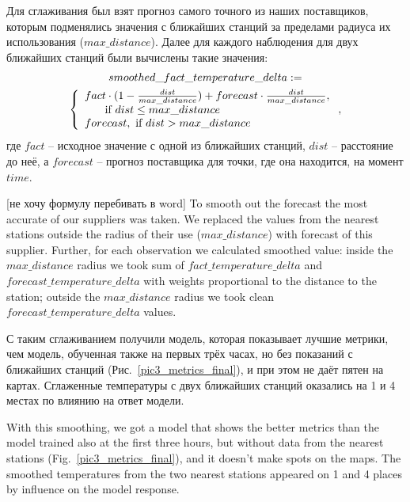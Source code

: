 \documentclass[14pt]{matmex-diploma}
\begin{document}
Для сглаживания был взят прогноз самого точного из наших поставщиков, которым подменялись значения с ближайших станций за пределами радиуса их использования ($max\_distance$). Далее для каждого наблюдения для двух ближайших станций были вычислены такие значения: 
\begingroup
\setlength\abovedisplayskip{0pt}
\begin{multline*}
smoothed\_fact\_temperature\_delta := \\\left\{
                \begin{array}{ll}
                  fact \cdot (1 - \frac{dist}{max\_distance}) + forecast \cdot \frac{dist}{max\_distance},\\\indent \text{     if }dist \le max\_distance  \\
                  forecast, \text{ if } dist > max\_distance
                \end{array}
              \right.,
\end{multline*}
\endgroup
\indent где $fact$ -- исходное значение с одной из ближайших станций, $dist$ -- расстояние до неё, а $forecast$ -- прогноз поставщика для точки, где она находится, на момент $time$.

[не хочу формулу перебивать в word] To smooth out the forecast the most accurate of our suppliers was taken. We replaced the values from the nearest stations outside the radius of their use ($max\_distance$) with forecast of this supplier. Further, for each observation we calculated smoothed value: inside the $max\_distance$ radius we took sum of $fact\_temperature\_delta$ and $forecast\_temperature\_delta$ with weights proportional to the distance to the station; outside the $max\_distance$ radius we took clean $forecast\_temperature\_delta$ values. 


С таким сглаживанием получили модель, которая показывает лучшие метрики, чем модель, обученная также на первых трёх часах, но без показаний с ближайших станций (Рис.~\ref{pic3_metrics_final}), и при этом не даёт пятен на картах. Сглаженные температуры с двух ближайших станций оказались на 1 и 4 местах по влиянию на ответ модели.

With this smoothing, we got a model that shows the better metrics than the model trained also at the first three hours, but without data from the nearest stations (Fig.~\ref{pic3_metrics_final}), and it doesn't make spots on the maps. The smoothed temperatures from the two nearest stations appeared on 1 and 4 places by influence on the model response.

\end{document}
